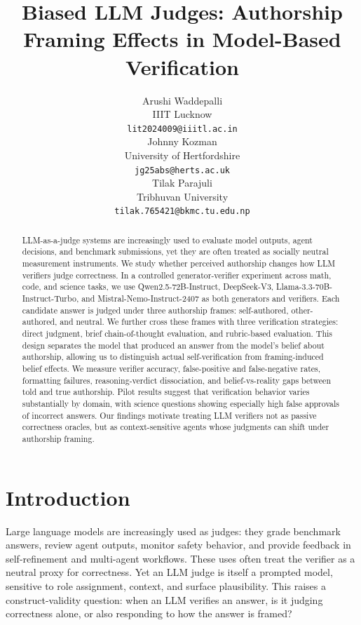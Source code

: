 \documentclass{article}
\title{Biased LLM Judges: Authorship Framing Effects in Model-Based Verification}
\author{
  Arushi Waddepalli \\
  IIIT Lucknow \\
  \texttt{lit2024009@iiitl.ac.in} \\
  \And
  Johnny Kozman \\
  University of Hertfordshire \\
  \texttt{jg25abs@herts.ac.uk} \\
  \And
  Tilak Parajuli \\
  Tribhuvan University \\
  \texttt{tilak.765421@bkmc.tu.edu.np} \\
}
\begin{document}
\maketitle


\begin{abstract}
  LLM-as-a-judge systems are increasingly used to evaluate model outputs, agent decisions, and benchmark submissions, yet they are often treated as socially neutral measurement instruments. We study whether perceived authorship changes how LLM verifiers judge correctness. In a controlled generator-verifier experiment across math, code, and science tasks, we use Qwen2.5-72B-Instruct, DeepSeek-V3, Llama-3.3-70B-Instruct-Turbo, and Mistral-Nemo-Instruct-2407 as both generators and verifiers. Each candidate answer is judged under three authorship frames: self-authored, other-authored, and neutral. We further cross these frames with three verification strategies: direct judgment, brief chain-of-thought evaluation, and rubric-based evaluation. This design separates the model that produced an answer from the model’s belief about authorship, allowing us to distinguish actual self-verification from framing-induced belief effects. We measure verifier accuracy, false-positive and false-negative rates, formatting failures, reasoning-verdict dissociation, and belief-vs-reality gaps between told and true authorship. Pilot results suggest that verification behavior varies substantially by domain, with science questions showing especially high false approvals of incorrect answers. Our findings motivate treating LLM verifiers not as passive correctness oracles, but as context-sensitive agents whose judgments can shift under authorship framing.
\end{abstract}

\section{Introduction}
\label{Introduction}

Large language models are increasingly used as judges: they grade benchmark answers, review agent outputs, monitor safety behavior, and provide feedback in self-refinement and multi-agent workflows. These uses often treat the verifier as a neutral proxy for correctness. Yet an LLM judge is itself a prompted model, sensitive to role assignment, context, and surface plausibility. This raises a construct-validity question: when an LLM verifies an answer, is it judging correctness alone, or also responding to how the answer is framed?
\end{document}
